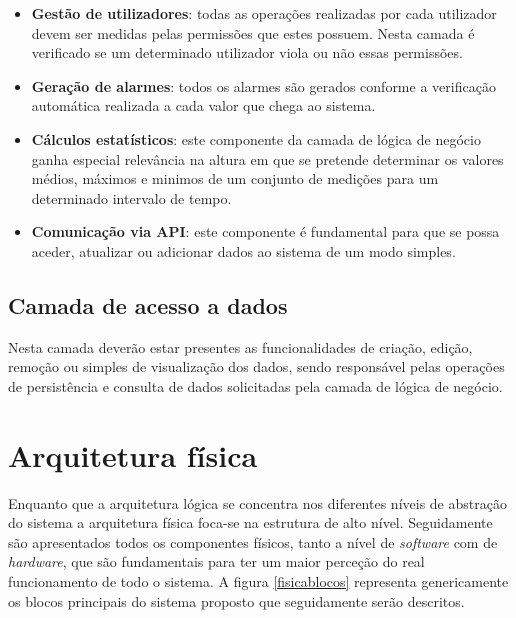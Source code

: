 \begin{itemize}
	\item \textbf{Gestão de utilizadores}: todas as operações realizadas por cada utilizador devem ser medidas pelas permissões que estes possuem. Nesta camada é verificado se um determinado utilizador viola ou não essas permissões. 
	
	\item \textbf{Geração de alarmes}: todos os alarmes são gerados conforme a verificação automática realizada a cada valor que chega ao sistema. 
	\item \textbf{Cálculos estatísticos}: este componente da camada de lógica de negócio ganha especial relevância na altura em que se pretende determinar os valores médios, máximos e minimos de um conjunto de medições para um determinado intervalo de tempo. 
	\item \textbf{Comunicação via \ac{API}}: este componente é fundamental para que se possa aceder, atualizar ou adicionar dados ao sistema de um modo simples.
\end{itemize}



\subsection{Camada de acesso a dados}


Nesta camada deverão estar presentes as funcionalidades de criação, edição, remoção ou simples de visualização dos dados, sendo responsável pelas operações de persistência e consulta de dados solicitadas pela camada de lógica de negócio.


\newpage
\section{Arquitetura física}


Enquanto que a arquitetura lógica se concentra nos diferentes níveis de abstração do sistema a arquitetura física foca-se na estrutura de alto nível.  
Seguidamente são apresentados todos os componentes físicos, tanto  a nível de \textit{software} com de \textit{hardware}, que são fundamentais para ter um maior perceção do real funcionamento de todo o sistema. 
A figura \ref{fisicablocos} representa genericamente os blocos principais do sistema proposto que seguidamente serão descritos. 


